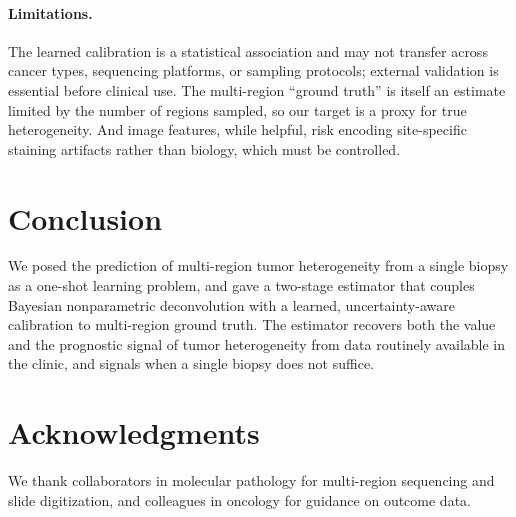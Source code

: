 \documentclass{article}
\begin{document}
\paragraph{Limitations.} The learned calibration is a statistical association and may
not transfer across cancer types, sequencing platforms, or sampling protocols;
external validation is essential before clinical use. The multi-region ``ground
truth'' is itself an estimate limited by the number of regions sampled, so our target
is a proxy for true heterogeneity. And image features, while helpful, risk encoding
site-specific staining artifacts rather than biology, which must be controlled.

\section{Conclusion}

We posed the prediction of multi-region tumor heterogeneity from a single biopsy as a
one-shot learning problem, and gave a two-stage estimator that couples Bayesian
nonparametric deconvolution with a learned, uncertainty-aware calibration to
multi-region ground truth. The estimator recovers both the value and the prognostic
signal of tumor heterogeneity from data routinely available in the clinic, and
signals when a single biopsy does not suffice.

\section*{Acknowledgments}

We thank collaborators in molecular pathology for multi-region sequencing and slide
digitization, and colleagues in oncology for guidance on outcome data.
\end{document}
